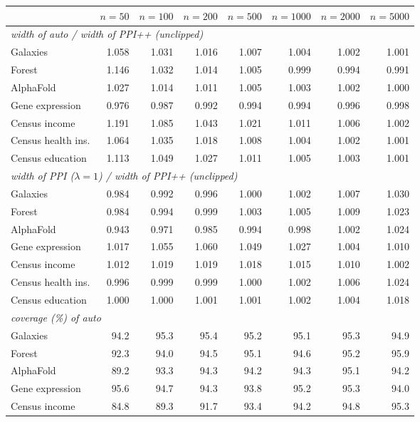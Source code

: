 \begin{tabular}{lrrrrrrr}
\toprule
 & $n{=}50$ & $n{=}100$ & $n{=}200$ & $n{=}500$ & $n{=}1000$ & $n{=}2000$ & $n{=}5000$\\
\midrule
\multicolumn{8}{l}{\emph{width of auto / width of PPI++ (unclipped)}}\\
Galaxies & 1.058 & 1.031 & 1.016 & 1.007 & 1.004 & 1.002 & 1.001\\
Forest & 1.146 & 1.032 & 1.014 & 1.005 & 0.999 & 0.994 & 0.991\\
AlphaFold & 1.027 & 1.014 & 1.011 & 1.005 & 1.003 & 1.002 & 1.000\\
Gene expression & 0.976 & 0.987 & 0.992 & 0.994 & 0.994 & 0.996 & 0.998\\
Census income & 1.191 & 1.085 & 1.043 & 1.021 & 1.011 & 1.006 & 1.002\\
Census health ins. & 1.064 & 1.035 & 1.018 & 1.008 & 1.004 & 1.002 & 1.001\\
Census education & 1.113 & 1.049 & 1.027 & 1.011 & 1.005 & 1.003 & 1.001\\
\midrule
\multicolumn{8}{l}{\emph{width of PPI ($\lambda{=}1$) / width of PPI++ (unclipped)}}\\
Galaxies & 0.984 & 0.992 & 0.996 & 1.000 & 1.002 & 1.007 & 1.030\\
Forest & 0.984 & 0.994 & 0.999 & 1.003 & 1.005 & 1.009 & 1.023\\
AlphaFold & 0.943 & 0.971 & 0.985 & 0.994 & 0.998 & 1.002 & 1.024\\
Gene expression & 1.017 & 1.055 & 1.060 & 1.049 & 1.027 & 1.004 & 1.010\\
Census income & 1.012 & 1.019 & 1.019 & 1.018 & 1.015 & 1.010 & 1.002\\
Census health ins. & 0.996 & 0.999 & 0.999 & 1.000 & 1.002 & 1.006 & 1.024\\
Census education & 1.000 & 1.000 & 1.001 & 1.001 & 1.002 & 1.004 & 1.018\\
\midrule
\multicolumn{8}{l}{\emph{coverage (\%) of auto}}\\
Galaxies & 94.2 & 95.3 & 95.4 & 95.2 & 95.1 & 95.3 & 94.9\\
Forest & 92.3 & 94.0 & 94.5 & 95.1 & 94.6 & 95.2 & 95.9\\
AlphaFold & 89.2 & 93.3 & 94.3 & 94.2 & 94.3 & 95.1 & 94.2\\
Gene expression & 95.6 & 94.7 & 94.3 & 93.8 & 95.2 & 95.3 & 94.0\\
Census income & 84.8 & 89.3 & 91.7 & 93.4 & 94.2 & 94.8 & 95.3\\

\end{tabular}
